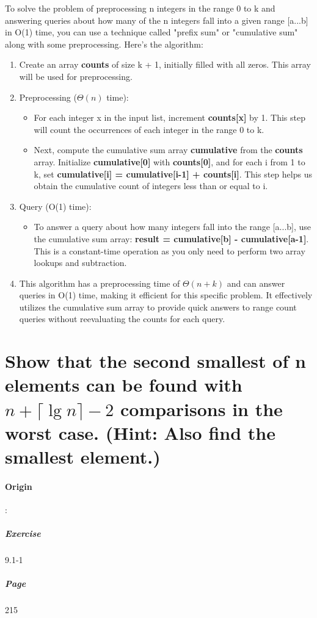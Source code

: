 \documentclass{article}
\begin{document}
To solve the problem of preprocessing n integers in the range 0 to k and answering queries about how many of the n integers fall into a given range [a...b] in O(1) time, you can use a technique called "prefix sum" or "cumulative sum" along with some preprocessing. Here's the algorithm:

\begin{enumerate}
  \item Create an array \textbf{counts} of size k + 1, initially filled with all zeros. This array will be used for preprocessing.
  \item Preprocessing ($\Theta(n)$ time):
  \begin{itemize}
    \item For each integer x in the input list, increment \textbf{counts[x]} by 1. This step will count the occurrences of each integer in the range 0 to k.
    \item Next, compute the cumulative sum array \textbf{cumulative} from the \textbf{counts} array. Initialize \textbf{cumulative[0]} with \textbf{counts[0]}, and for each i from 1 to k, set \textbf{cumulative[i] = cumulative[i-1] + counts[i]}. This step helps us obtain the cumulative count of integers less than or equal to i.
  \end{itemize}
  \item Query (O(1) time):
  \begin{itemize}
    \item To answer a query about how many integers fall into the range [a...b], use the cumulative sum array: \textbf{result = cumulative[b] - cumulative[a-1]}. This is a constant-time operation as you only need to perform two array lookups and subtraction.
  \end{itemize}
  \item This algorithm has a preprocessing time of $\Theta(n + k)$ and can answer queries in O(1) time, making it efficient for this specific problem. It effectively utilizes the cumulative sum array to provide quick answers to range count queries without reevaluating the counts for each query.
\end{enumerate}

\section{Show that the second smallest of n elements can be found with $n+\lceil \lg n\rceil -2$ comparisons in the worst case. (Hint: Also find the smallest element.)}
\paragraph{Origin}:
  \subparagraph{Exercise}9.1-1
  \subparagraph{Page}215
\end{document}
